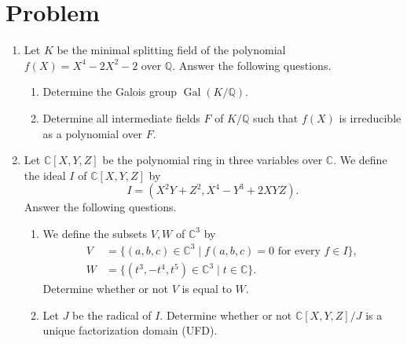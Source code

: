 \documentclass{article}
\begin{document}
\section*{Problem}
\begin{enumerate}[label=\fbox{\arabic*}]
  \item Let $K$ be the minimal splitting field of the polynomial $f(X) = X^4 - 2X^2 - 2$ over $\mathbb{Q}$. Answer the following questions.
        \begin{enumerate}[label=(\arabic*)]
          \item Determine the Galois group $\operatorname{Gal}(K/\mathbb{Q})$.
          \item Determine all intermediate fields $F$ of $K/\mathbb{Q}$ such that $f(X)$ is irreducible as a polynomial over $F$.
        \end{enumerate}

  \item Let $\mathbb{C}[X, Y, Z]$ be the polynomial ring in three variables over $\mathbb{C}$. We define the ideal $I$ of $\mathbb{C}[X, Y, Z]$ by
        \[
          I = (X^2Y + Z^2, X^4 - Y^3 + 2XYZ).
        \]
        Answer the following questions.
        \begin{enumerate}[label=(\arabic*)]
          \item We define the subsets $V, W$ of $\mathbb{C}^3$ by
                \begin{align*}
                  V & = \{ (a, b, c) \in \mathbb{C}^3 \mid f(a, b, c) = 0 \text{ for every } f \in I \}, \\
                  W & = \{ (t^3, -t^4, t^5) \in \mathbb{C}^3 \mid t \in \mathbb{C} \}.
                \end{align*}
                Determine whether or not $V$ is equal to $W$.
          \item Let $J$ be the radical of $I$. Determine whether or not $\mathbb{C}[X, Y, Z]/J$ is a unique factorization domain (UFD).
        \end{enumerate}


\end{enumerate}
\end{document}

